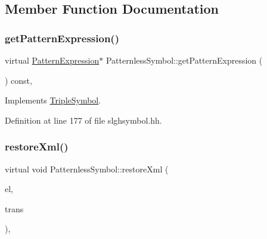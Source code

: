 \subsection{Member Function Documentation}
\mbox{\label{class_patternless_symbol_aa0143261780eb2f63e09a6f8f377a888}} 
\subsubsection{\texorpdfstring{getPatternExpression()}{getPatternExpression()}}
{\footnotesize\ttfamily virtual \mbox{\hyperlink{class_pattern_expression}{Pattern\+Expression}}$\ast$ Patternless\+Symbol\+::get\+Pattern\+Expression (\begin{DoxyParamCaption}\item[{void}]{ }\end{DoxyParamCaption}) const\hspace{0.3cm}{\ttfamily [inline]}, {\ttfamily [virtual]}}



Implements \mbox{\hyperlink{class_triple_symbol_a213895658c5fe547edf9ac54a1d2de2e}{Triple\+Symbol}}.



Definition at line 177 of file slghsymbol.\+hh.

\mbox{\label{class_patternless_symbol_ab81f5522c0e65c2fe464d4bb62193948}} 
\subsubsection{\texorpdfstring{restoreXml()}{restoreXml()}}
{\footnotesize\ttfamily virtual void Patternless\+Symbol\+::restore\+Xml (\begin{DoxyParamCaption}\item[{const \mbox{\hyperlink{class_element}{Element}} $\ast$}]{el,  }\item[{\mbox{\hyperlink{class_sleigh_base}{Sleigh\+Base}} $\ast$}]{trans }\end{DoxyParamCaption})\hspace{0.3cm}{\ttfamily [inline]}, {\ttfamily [virtual]}}



